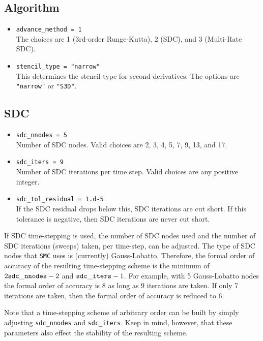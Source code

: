 \documentclass[11pt,letterpaper]{article}
\begin{document}
\subsection{Algorithm}

\begin{itemize}
\item {\tt advance\_method = 1}\\
  The choices are 1 (3rd-order Runge-Kutta), 2 (SDC), and 3
  (Multi-Rate SDC).
\item {\tt stencil\_type = "narrow"}\\
  This determines the stencil type for second derivatives. The options
  are {\tt "narrow"} or {\tt "S3D"}.
\end{itemize}

\subsection{SDC}

\begin{itemize}
\item {\tt sdc\_nnodes = 5}\\
  Number of SDC nodes.  Valid choices are 2, 3, 4, 5, 7, 9, 13, and 17.
\item {\tt sdc\_iters = 9}\\
  Number of SDC iterations per time step.  Valid choices are any
  positive integer.
\item {\tt sdc\_tol\_residual = 1.d-5}\\
  If the SDC residual drops below this, SDC iterations are cut short.
  If this tolerance is negative, then SDC iterations are never cut
  short.
\end{itemize}

If SDC time-stepping is used, the number of SDC nodes used and the
number of SDC iterations (sweeps) taken, per time-step, can be
adjusted.  The type of SDC nodes that {\tt SMC} uses is (currently)
Gauss-Lobatto.  Therefore, the formal order of accuracy of the
resulting time-stepping scheme is the minimum of $2{\tt sdc\_nnodes} -
2$ and ${\tt sdc\_iters} - 1$.  For example, with 5 Gauss-Lobatto
nodes the formal order of accuracy is 8 as long as 9 iterations are
taken.  If only 7 iterations are taken, then the formal order of
accuracy is reduced to 6.

Note that a time-stepping scheme of arbitrary order can be built by
simply adjusting {\tt sdc\_nnodes} and {\tt sdc\_iters}.  Keep in
mind, however, that these parameters also effect the stability of the
resulting scheme.
\end{document}
